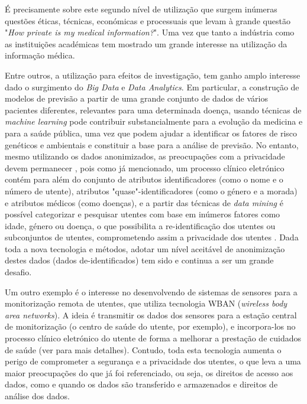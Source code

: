 \documentclass[conference]{IEEEtran}
\begin{document}
É precisamente sobre este segundo nível de utilização que surgem inúmeras questões éticas, técnicas, económicas e processuais que levam à grande questão "\textit{How private is my medical information?}". Uma vez que tanto a indústria como as instituições académicas tem mostrado um grande interesse na utilização da informação médica. 

Entre outros, a utilização para efeitos de investigação, tem ganho amplo interesse dado o surgimento do \textit{Big Data} e \textit{Data Analytics}. Em particular, a construção de modelos de previsão a partir de uma grande conjunto de dados de vários pacientes diferentes, relevantes para uma determinada doença, usando técnicas de \textit{machine learning} pode contribuir substancialmente para a evolução da medicina e para a saúde pública, uma vez que podem ajudar a identificar os fatores de risco genéticos e ambientais e constituir a base para a análise de previsão. No entanto, mesmo utilizando os dados anonimizados, as preocupações com a privacidade devem permanecer \cite{bos2014private}, pois como já mencionado, um processo clínico eletrónico contém para além do conjunto de atributos identificadores (como o nome e o número de utente), atributos "quase"-identificadores (como o género e a morada) e atributos médicos (como doenças), e a partir das técnicas de \textit{data mining} é possível categorizar e pesquisar utentes com base em inúmeros fatores como idade, género ou doença, o que possibilita a re-identificação dos utentes ou subconjuntos de utentes, comprometendo assim a privacidade dos utentes \cite{meingast2006security}.
Dada toda a nova tecnologia e métodos, adotar um nível aceitável de anonimização destes dados (dados de-identificados) tem sido e continua a ser um grande desafio.

Um outro exemplo é o interesse no desenvolvendo de sistemas de sensores para a monitorização remota de utentes, que utiliza tecnologia WBAN (\textit{wireless body area networks}). A ideia é transmitir os dados dos sensores para a estação central de monitorização (o centro de saúde do utente, por exemplo), e incorpora-los no processo clínico eletrónico do utente de forma a melhorar a prestação de cuidados de saúde (ver \cite{meingast2006security} para mais detalhes). Contudo, toda esta tecnologia aumenta o perigo de comprometer a segurança e a privacidade dos utentes, o que leva a uma maior preocupações do que já foi referenciado, ou seja, os direitos de acesso aos dados, como e quando os dados são transferido e armazenados e direitos de análise dos dados.
\end{document}
